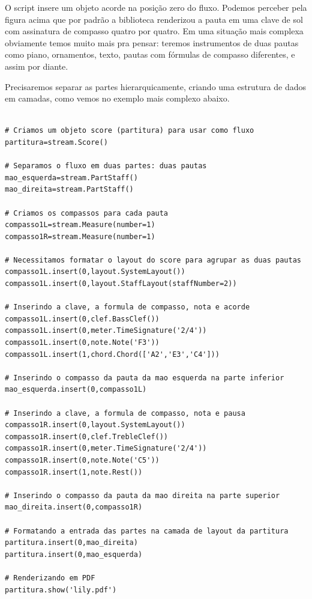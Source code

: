 \documentclass[
	12pt,				%
	openright,			%
	twoside,			%
	a4paper,			%
	english,			%
	french,				%
	spanish,			%
	brazil				%
	]{abntex2}
\begin{document}
O script insere um objeto acorde na posição zero do fluxo. Podemos perceber pela figura acima que por padrão a biblioteca renderizou a pauta em uma clave de sol com assinatura de compasso quatro por quatro. Em uma situação mais complexa obviamente temos muito mais pra pensar: teremos instrumentos de duas pautas como piano, ornamentos, texto, pautas com fórmulas de compasso diferentes, e assim por diante.

Precisaremos separar as partes hierarquicamente, criando uma estrutura de dados em camadas, como vemos no exemplo mais complexo abaixo. 


\begin{lstlisting}

# Criamos um objeto score (partitura) para usar como fluxo
partitura=stream.Score()

# Separamos o fluxo em duas partes: duas pautas
mao_esquerda=stream.PartStaff()
mao_direita=stream.PartStaff()

# Criamos os compassos para cada pauta 
compasso1L=stream.Measure(number=1)
compasso1R=stream.Measure(number=1)

# Necessitamos formatar o layout do score para agrupar as duas pautas
compasso1L.insert(0,layout.SystemLayout())
compasso1L.insert(0,layout.StaffLayout(staffNumber=2))

# Inserindo a clave, a formula de compasso, nota e acorde
compasso1L.insert(0,clef.BassClef())
compasso1L.insert(0,meter.TimeSignature('2/4'))
compasso1L.insert(0,note.Note('F3'))
compasso1L.insert(1,chord.Chord(['A2','E3','C4']))

# Inserindo o compasso da pauta da mao esquerda na parte inferior
mao_esquerda.insert(0,compasso1L)

# Inserindo a clave, a formula de compasso, nota e pausa
compasso1R.insert(0,layout.SystemLayout())
compasso1R.insert(0,clef.TrebleClef())
compasso1R.insert(0,meter.TimeSignature('2/4'))
compasso1R.insert(0,note.Note('C5'))
compasso1R.insert(1,note.Rest())

# Inserindo o compasso da pauta da mao direita na parte superior
mao_direita.insert(0,compasso1R)

# Formatando a entrada das partes na camada de layout da partitura
partitura.insert(0,mao_direita)
partitura.insert(0,mao_esquerda)

# Renderizando em PDF
partitura.show('lily.pdf')
\end{lstlisting}
\end{document}
